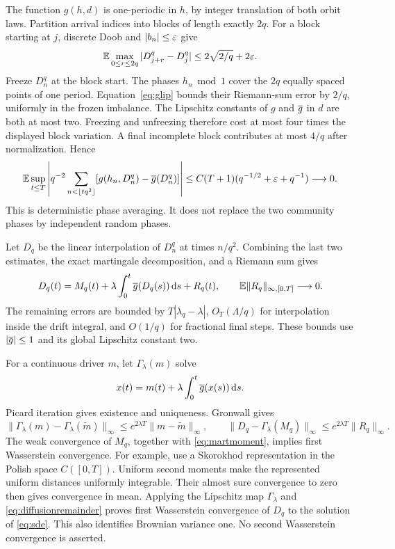 The function $g(h,d)$ is one-periodic in $h$, by integer translation of both orbit laws. Partition arrival indices into blocks of length exactly $2q$. For a block starting at $j$, discrete Doob and $|b_n|\le\varepsilon$ give
\[
 \mathbb E\max_{0\le r\le2q}|D_{j+r}^q-D_j^q|
 \le2\sqrt{2/q}+2\varepsilon.
\]
Freeze $D_n^q$ at the block start. The phases $h_n\bmod1$ cover the $2q$ equally spaced points of one period. Equation~\eqref{eq:glip} bounds their Riemann-sum error by $2/q$, uniformly in the frozen imbalance. The Lipschitz constants of $g$ and $\overline g$ in $d$ are both at most two. Freezing and unfreezing therefore cost at most four times the displayed block variation. A final incomplete block contributes at most $4/q$ after normalization. Hence
\begin{equation}\label{eq:phaseaverage}
 \mathbb E\sup_{t\le T}\left|q^{-2}\sum_{n<\lfloor tq^2\rfloor}
       [g(h_n,D_n^q)-\overline g(D_n^q)]\right|
 \le C(T+1)(q^{-1/2}+\varepsilon+q^{-1})\longrightarrow0.
\end{equation}
This is deterministic phase averaging. It does not replace the two community phases by independent random phases.

Let $D_q$ be the linear interpolation of $D_n^q$ at times $n/q^2$. Combining the last two estimates, the exact martingale decomposition, and a Riemann sum gives
\begin{equation}\label{eq:diffusionremainder}
 D_q(t)=M_q(t)+\lambda\int_0^t\overline g(D_q(s))\,\mathrm d s+R_q(t),
 \qquad \mathbb E\|R_q\|_{\infty,[0,T]}\longrightarrow0.
\end{equation}
The remaining errors are bounded by $T|\lambda_q-\lambda|$, $O_T(\Lambda/q)$ for interpolation inside the drift integral, and $O(1/q)$ for fractional final steps. These bounds use $|\overline g|\le1$ and its global Lipschitz constant two.

For a continuous driver $m$, let $\Gamma_\lambda(m)$ solve
\[
 x(t)=m(t)+\lambda\int_0^t\overline g(x(s))\,\mathrm d s.
\]
Picard iteration gives existence and uniqueness. Gronwall gives
\[
 \|\Gamma_\lambda(m)-\Gamma_\lambda(\widetilde m)\|_\infty
 \le e^{2\lambda T}\|m-\widetilde m\|_\infty,
 \qquad
 \|D_q-\Gamma_\lambda(M_q)\|_\infty
 \le e^{2\lambda T}\|R_q\|_\infty.
\]
The weak convergence of $M_q$, together with \eqref{eq:martmoment}, implies first Wasserstein convergence. For example, use a Skorokhod representation in the Polish space $C([0,T])$. Uniform second moments make the represented uniform distances uniformly integrable. Their almost sure convergence to zero then gives convergence in mean. Applying the Lipschitz map $\Gamma_\lambda$ and \eqref{eq:diffusionremainder} proves first Wasserstein convergence of $D_q$ to the solution of \eqref{eq:sde}. This also identifies Brownian variance one. No second Wasserstein convergence is asserted.

